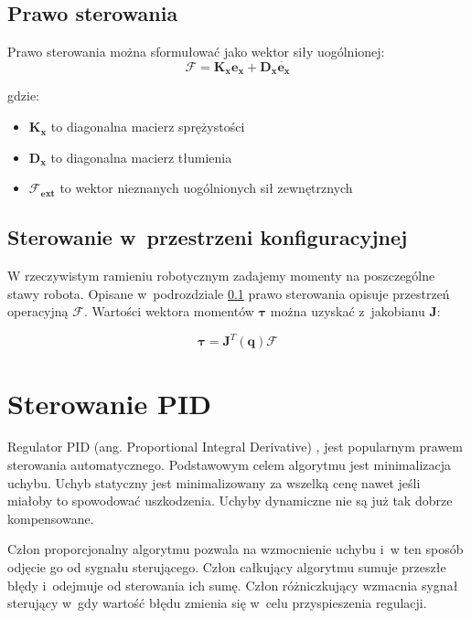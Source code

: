 \subsection{Prawo sterowania}
\label{sec:impedancyjne}

Prawo sterowania można sformułować  jako wektor siły uogólnionej:
\begin{equation}
\boldsymbol{\mathcal{F}} = \boldsymbol{K_x}\boldsymbol{e_x} + \boldsymbol{D_x}\dot{\boldsymbol{e_x}}
\end{equation}

gdzie:
\begin{itemize}
\item $\boldsymbol{K_x}$ to diagonalna macierz sprężystości
\item $\boldsymbol{D_x}$ to diagonalna macierz tłumienia
\item $\boldsymbol{\mathcal{F}_{ext}}$ to wektor nieznanych uogólnionych sił zewnętrznych
\end{itemize}

\subsection{Sterowanie w~przestrzeni konfiguracyjnej}
\label{chap:jakobian}
W rzeczywistym ramieniu robotycznym zadajemy momenty na poszczególne stawy robota. Opisane w~podrozdziale \ref{sec:impedancyjne} prawo sterowania opisuje przestrzeń operacyjną $\boldsymbol{\mathcal{F}}$.  Wartości wektora momentów $\boldsymbol{\tau}$ można uzyskać z~jakobianu $\boldsymbol{J}$:

\begin{equation}
\boldsymbol{\tau} = \boldsymbol{J}^T(\boldsymbol{q})\boldsymbol{\mathcal{F}}
\end{equation}

\section{Sterowanie PID}
\label{chap:key}
Regulator PID (ang. Proportional Integral Derivative) \cite{bib:pidTito}, \cite{bib:pidMimo} jest popularnym prawem sterowania automatycznego. Podstawowym celem algorytmu jest minimalizacja uchybu. Uchyb statyczny jest minimalizowany za wszelką cenę nawet jeśli miałoby to spowodować uszkodzenia. Uchyby dynamiczne nie są już tak dobrze kompensowane.

Człon proporcjonalny algorytmu pozwala na wzmocnienie uchybu i~w ten sposób odjęcie go od sygnału sterującego. Człon całkujący algorytmu sumuje przeszłe błędy i~odejmuje od sterowania ich sumę. Człon różniczkujący wzmacnia sygnał sterujący w~gdy wartość błędu zmienia się w~celu przyspieszenia regulacji.
